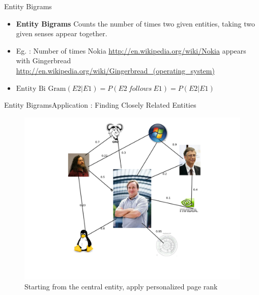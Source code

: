 \begin{frame}{Entity Bigrams}
\begin{itemize}
 \item \textbf{Entity Bigrams} Counts the number of times two given entities, taking two given senses appear together. \medskip
\item Eg. : Number of times Nokia \url{http://en.wikipedia.org/wiki/Nokia} appears with Gingerbread \url{http://en.wikipedia.org/wiki/Gingerbread_(operating_system)} \medskip


 \item $\text{Entity Bi Gram}(E2|E1) = P (E2\ follows\ E1) = P (E2|E1)$
 \end{itemize}
\end{frame}


\begin{frame}{Entity Bigrams}{Application : Finding Closely Related Entities}
 \begin{figure}[h]
 \centering
 \includegraphics[bb=0 0 1024 768, scale=0.30]{./rel.png}
 \caption{Starting from the central entity, apply personalized page rank}
\end{figure}

\end{frame}
